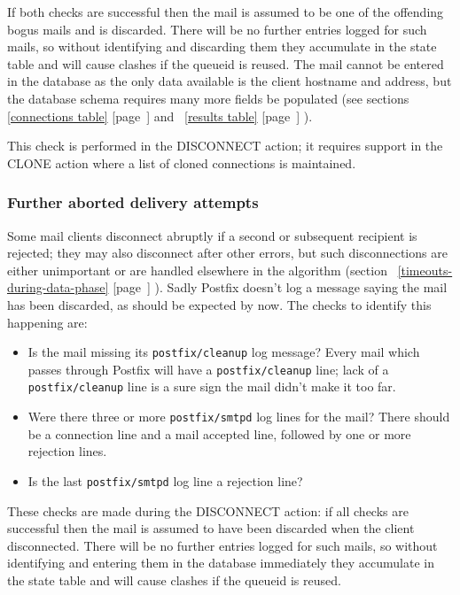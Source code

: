 \documentclass[a4paper,12pt,draft]{article}
\newcommand{\refwithpage}[1]{%
    \empty{}\ref{#1} [page~\pageref{#1}]%
}
\newcommand{\daemon}[1]{%
    \texttt{postfix/#1}%
}
\begin{document}
If both checks are successful then the mail is assumed to be one of the
offending bogus mails and is discarded.  There will be no further entries
logged for such mails, so without identifying and discarding them they
accumulate in the state table and will cause clashes if the queueid is
reused.  The mail cannot be entered in the database as the only data
available is the client hostname and \IP{} address, but the database schema
requires many more fields be populated (see
sections~\refwithpage{connections table} and~\refwithpage{results table}).

This check is performed in the DISCONNECT action; it requires support in
the CLONE action where a list of cloned connections is maintained.

\subsubsection{Further aborted delivery attempts}

Some mail clients disconnect abruptly if a second or subsequent recipient
is rejected; they may also disconnect after other errors, but such
disconnections are either unimportant or are handled elsewhere in the
algorithm (section~\refwithpage{timeouts-during-data-phase}).  Sadly
Postfix doesn't log a message saying the mail has been discarded, as should
be expected by now.  The checks to identify this happening are:

\begin{itemize}

    \item Is the mail missing its \daemon{cleanup} log message?  Every mail
        which passes through Postfix will have a \daemon{cleanup} line;
        lack of a \daemon{cleanup} line is a sure sign the mail didn't make
        it too far.

    \item Were there three or more \daemon{smtpd} log lines for the mail?
        There should be a connection line and a mail accepted line,
        followed by one or more rejection lines.

    \item Is the last \daemon{smtpd} log line a rejection line?

\end{itemize}

These checks are made during the DISCONNECT action: if all checks are
successful then the mail is assumed to have been discarded when the client
disconnected.  There will be no further entries logged for such mails, so
without identifying and entering them in the database immediately they
accumulate in the state table and will cause clashes if the queueid is
reused.
\end{document}
